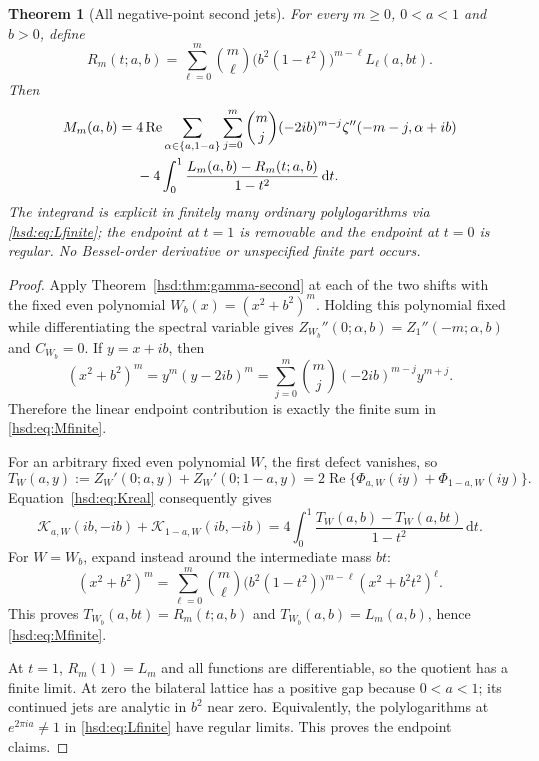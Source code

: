 \documentclass[11pt]{article}
\numberwithin{equation}{section}
\newtheorem{theorem}{Theorem}[section]
\theoremstyle{definition}\newtheorem{definition}[theorem]{Definition}
\theoremstyle{remark}\newtheorem{remark}[theorem]{Remark}
\DeclareMathOperator{\Rea}{Re}
\newcommand{\dd}{\,\mathrm d}
\newcommand{\KK}{\mathcal K}
\begin{document}
\begin{theorem}[All negative-point second jets]\label{hsd:thm:negative-second}
For every $m\ge0$, $0<a<1$ and $b>0$, define
\begin{equation}\label{hsd:eq:Rintegrand}
 R_m(t;a,b)=\sum_{\ell=0}^m\binom m\ell
       \bigl(b^2(1-t^2)\bigr)^{m-\ell}L_\ell(a,bt).
\end{equation}
Then
\begin{align}
 M_m(a,b)={}&4\Rea\sum_{\alpha\in\{a,1-a\}}\sum_{j=0}^m
 \binom mj(-2ib)^{m-j}\zeta''(-m-j,\alpha+ib)\notag\\
 &-4\int_0^1\frac{L_m(a,b)-R_m(t;a,b)}{1-t^2}\dd t.
 \label{hsd:eq:Mfinite}
\end{align}
The integrand is explicit in finitely many ordinary polylogarithms via
\eqref{hsd:eq:Lfinite}; the endpoint at $t=1$ is removable and the
endpoint at $t=0$ is regular. No Bessel-order derivative or unspecified
finite part occurs.
\end{theorem}
\begin{proof}
Apply Theorem~\ref{hsd:thm:gamma-second} at each of the two shifts with
the fixed even polynomial $W_b(x)=(x^2+b^2)^m$. Holding this polynomial
fixed while differentiating the spectral variable gives
$Z_{W_b}''(0;\alpha,b)=Z_1''(-m;\alpha,b)$ and $C_{W_b}=0$.
If $y=x+ib$, then
\[
 (x^2+b^2)^m=y^m(y-2ib)^m
 =\sum_{j=0}^m\binom mj(-2ib)^{m-j}y^{m+j}.
\]
Therefore the linear endpoint contribution is exactly the finite sum in
\eqref{hsd:eq:Mfinite}.

For an arbitrary fixed even polynomial $W$, the first defect vanishes,
so
\[
 T_W(a,y):=Z_W'(0;a,y)+Z_W'(0;1-a,y)
 =2\Rea\{\Phi_{a,W}(iy)+\Phi_{1-a,W}(iy)\}.
\]
Equation~\eqref{hsd:eq:Kreal} consequently gives
\begin{equation}\label{hsd:eq:bilatK}
 \KK_{a,W}(ib,-ib)+\KK_{1-a,W}(ib,-ib)
 =4\int_0^1\frac{T_W(a,b)-T_W(a,bt)}{1-t^2}\dd t.
\end{equation}
For $W=W_b$, expand instead around the intermediate mass $bt$:
\[
 (x^2+b^2)^m=\sum_{\ell=0}^m\binom m\ell
      \bigl(b^2(1-t^2)\bigr)^{m-\ell}(x^2+b^2t^2)^\ell.
\]
This proves $T_{W_b}(a,bt)=R_m(t;a,b)$ and
$T_{W_b}(a,b)=L_m(a,b)$, hence \eqref{hsd:eq:Mfinite}.

At $t=1$, $R_m(1)=L_m$ and all functions are differentiable, so the
quotient has a finite limit. At zero the bilateral lattice has a positive
gap because $0<a<1$; its continued jets are analytic in $b^2$ near zero.
Equivalently, the polylogarithms at $e^{2\pi ia}\ne1$ in
\eqref{hsd:eq:Lfinite} have regular limits. This proves the endpoint claims.
\end{proof}
\end{document}
